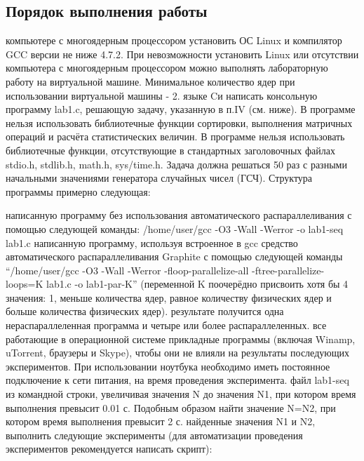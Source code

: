 { %
	\subsection{Порядок выполнения работы}
	\begin{enumerate}
		 компьютере с многоядерным процессором установить ОС Linux и компилятор GCC версии не ниже 4.7.2. При невозможности установить Linux или отсутствии компьютера с многоядерным процессором можно выполнять лабораторную работу на виртуальной машине. Минимальное количество ядер при использовании виртуальной машины - 2.
		 языке Cи написать консольную программу lab1.c, решающую задачу, указанную в п.IV (см. ниже). В программе нельзя использовать библиотечные функции сортировки, выполнения матричных операций и расчёта статистических величин.  В программе
нельзя использовать библиотечные функции, отсутствующие в стандартных заголовочных файлах stdio.h, stdlib.h, math.h, sys/time.h. Задача должна решаться 50 раз с разными начальными значениями генератора случайных чисел (ГСЧ).  Структура программы примерно следующая:
			\begin{figure}[H]
				
			\end{figure}
		 написанную программу без использования автоматического распараллеливания с помощью следующей команды: /home/user/gcc -O3 -Wall -Werror -o lab1-seq lab1.c
		 написанную программу, используя встроенное в gcc средство автоматического распараллеливания Graphite с помощью следующей команды “/home/user/gcc -O3 -Wall -Werror -floop-parallelize-all -ftree-parallelize-loops=K lab1.c -o lab1-par-K” (переменной K поочерёдно присвоить хотя бы 4 значения: 1, меньше количества ядер, равное количеству физических ядер и больше количества физических ядер).
		 результате получится одна нераспараллеленная программа и четыре или более распараллеленных.
		 все работающие в операционной системе прикладные программы (включая Winamp, uTorrent, браузеры и Skype), чтобы они не влияли на результаты последующих экспериментов. При использовании ноутбука необходимо иметь постоянное подключение к сети питания, на время проведения эксперимента.
		 файл lab1-seq из командной строки, увеличивая значения N до значения N1, при котором время выполнения превысит 0.01 с. Подобным образом найти значение N=N2, при котором время выполнения превысит 2 с.
		 найденные значения N1 и N2, выполнить следующие эксперименты (для автоматизации проведения экспериментов рекомендуется написать скрипт):

\end{enumerate}}
